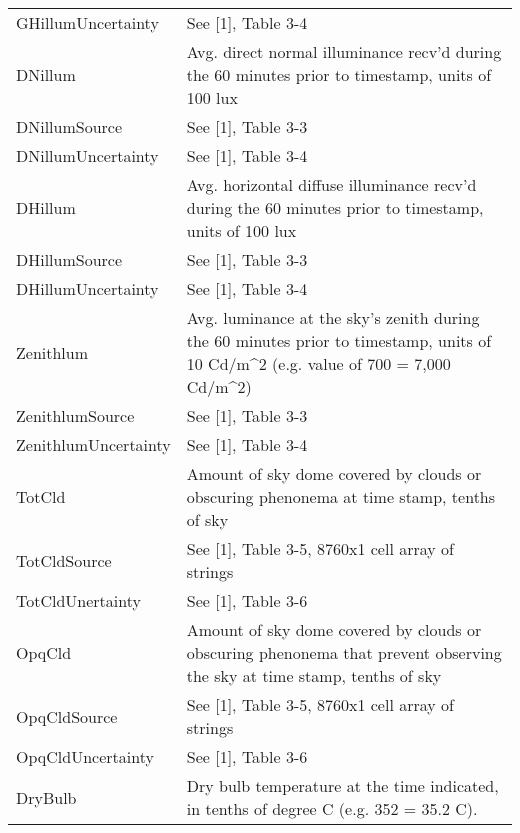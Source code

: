 \documentclass[letterpaper,10pt,english]{sphinxmanual}
\begin{document}
\begin{fulllineitems}
\begin{longtable}{|l|p{11cm}|}
GHillumUncertainty
 & 
See {[}1{]}, Table 3-4
\\

DNillum
 & 
Avg. direct normal illuminance recv'd during the 60 minutes prior to timestamp, units of 100 lux
\\

DNillumSource
 & 
See {[}1{]}, Table 3-3
\\

DNillumUncertainty
 & 
See {[}1{]}, Table 3-4
\\

DHillum
 & 
Avg. horizontal diffuse illuminance recv'd during the 60 minutes prior to timestamp, units of 100 lux
\\

DHillumSource
 & 
See {[}1{]}, Table 3-3
\\

DHillumUncertainty
 & 
See {[}1{]}, Table 3-4
\\

Zenithlum
 & 
Avg. luminance at the sky's zenith during the 60 minutes prior to timestamp, units of 10 Cd/m\textasciicircum{}2 (e.g. value of 700 = 7,000 Cd/m\textasciicircum{}2)
\\

ZenithlumSource
 & 
See {[}1{]}, Table 3-3
\\

ZenithlumUncertainty
 & 
See {[}1{]}, Table 3-4
\\

TotCld
 & 
Amount of sky dome covered by clouds or obscuring phenonema at time stamp, tenths of sky
\\

TotCldSource
 & 
See {[}1{]}, Table 3-5, 8760x1 cell array of strings
\\

TotCldUnertainty
 & 
See {[}1{]}, Table 3-6
\\

OpqCld
 & 
Amount of sky dome covered by clouds or obscuring phenonema that prevent observing the sky at time stamp, tenths of sky
\\

OpqCldSource
 & 
See {[}1{]}, Table 3-5, 8760x1 cell array of strings
\\

OpqCldUncertainty
 & 
See {[}1{]}, Table 3-6
\\

DryBulb
 & 
Dry bulb temperature at the time indicated, in tenths of degree C (e.g. 352 = 35.2 C).
\\


\end{longtable}
\end{fulllineitems}
\end{document}

